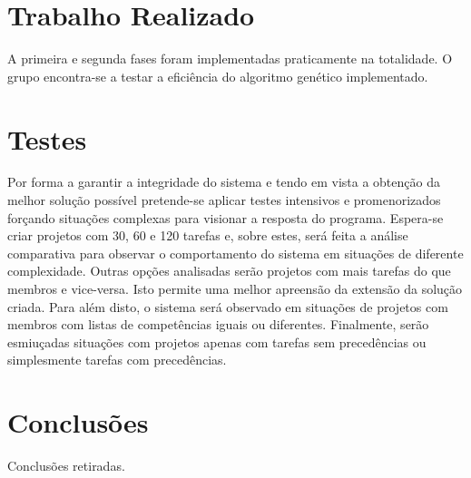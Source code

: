 \begin{titlepage}
\section{Trabalho Realizado}
\justify\normalsize
A primeira e segunda fases foram implementadas praticamente na totalidade. O grupo encontra-se a testar a eficiência do algoritmo genético implementado.

\section{Testes}
\justify\normalsize
Por forma a garantir a integridade do sistema e tendo em vista a obtenção da melhor solução possível pretende-se aplicar testes intensivos e promenorizados forçando situações complexas para visionar a resposta do programa. Espera-se criar projetos com 30, 60 e 120 tarefas e, sobre estes, será feita a análise comparativa para observar o comportamento do sistema em situações de diferente complexidade. Outras opções analisadas serão projetos com mais tarefas do que membros e vice-versa. Isto permite uma melhor apreensão da extensão da solução criada. Para além disto, o sistema será observado em situações de projetos com membros com listas de competências iguais ou diferentes. Finalmente, serão esmiuçadas situações com projetos apenas com tarefas sem precedências ou simplesmente tarefas com precedências.


\section{Conclusões}
\justify\normalsize
Conclusões retiradas.

\end{titlepage}
